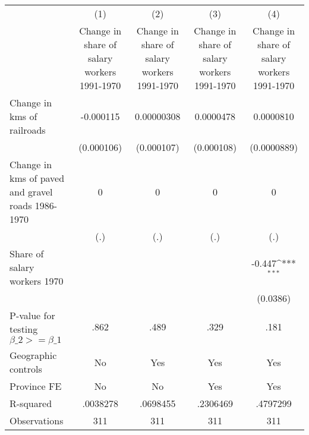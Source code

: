 {
\def\sym#1{\ifmmode^{#1}\else\(^{#1}\)\fi}
\begin{tabular}{l*{4}{c}}
\hline\hline
                &\multicolumn{1}{c}{(1)}&\multicolumn{1}{c}{(2)}&\multicolumn{1}{c}{(3)}&\multicolumn{1}{c}{(4)}\\
                &\multicolumn{1}{c}{Change in share of salary workers 1991-1970}&\multicolumn{1}{c}{Change in share of salary workers 1991-1970}&\multicolumn{1}{c}{Change in share of salary workers 1991-1970}&\multicolumn{1}{c}{Change in share of salary workers 1991-1970}\\
\hline
Change in kms of railroads&-0.000115         &0.00000308         &0.0000478         &0.0000810         \\
                &(0.000106)         &(0.000107)         &(0.000108)         &(0.0000889)         \\
[1em]
Change in kms of paved and gravel roads 1986-1970&        0         &        0         &        0         &        0         \\
                &      (.)         &      (.)         &      (.)         &      (.)         \\
[1em]
Share of salary workers 1970&                  &                  &                  &   -0.447\sym{***}\\
                &                  &                  &                  & (0.0386)         \\
\hline
P-value for testing $\beta\_{2} >= \beta\_{1}$&     .862         &     .489         &     .329         &     .181         \\
Geographic controls&       No         &      Yes         &      Yes         &      Yes         \\
Province FE     &       No         &       No         &      Yes         &      Yes         \\
R-squared       & .0038278         & .0698455         & .2306469         & .4797299         \\
Observations    &      311         &      311         &      311         &      311         \\
\hline\hline
\end{tabular}
}
